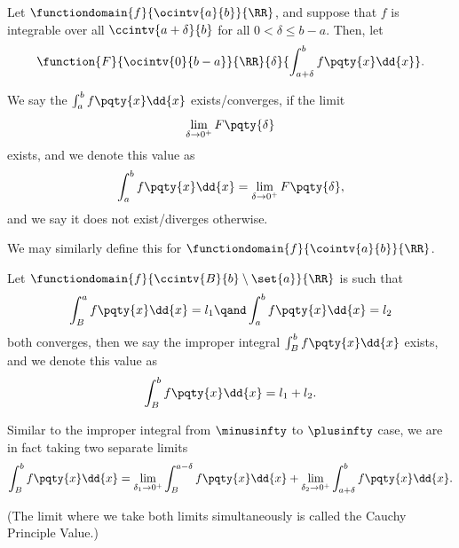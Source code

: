 \begin{definition}
    \label{def:improper-integral-isolated-singularity}%
    Let \(\functiondomain{f}{\ocintv{a}{b}}{\RR}\), and suppose that \(f\) is integrable over all \(\ccintv{a + \delta}{b}\) for all \(0 < \delta \leq b - a\). Then, let
    \[
        \function{F}{\ocintv{0}{b - a}}{\RR}{\delta}{\int_{a + \delta}^{b} f\pqty{x} \dd{x}}.
    \]

    We say the  \(\int_{a}^{b} f\pqty{x} \dd{x}\) exists/converges, if the limit
    \[
        \lim_{\delta \to 0^+} F\pqty{\delta}
    \]
    exists, and we denote this value as
    \[
        \int_{a}^{b} f\pqty{x} \dd{x} = \lim_{\delta \to 0^+} F\pqty{\delta},
    \]
    and we say it does not exist/diverges otherwise.

    We may similarly define this for \(\functiondomain{f}{\cointv{a}{b}}{\RR}\).

    Let \(\functiondomain{f}{\ccintv{B}{b} \setminus \set{a}}{\RR}\) is such that
    \[
        \int_{B}^{a} f\pqty{x} \dd{x} = l_1 \qand \int_{a}^{b} f\pqty{x} \dd{x} = l_2
    \]
    both converges, then we say the improper integral \(\int_{B}^{b} f\pqty{x} \dd{x}\) exists, and we denote this value as
    \[
        \int_{B}^{b} f\pqty{x} \dd{x} = l_1 + l_2.
    \]
\end{definition}

\begin{remark}
    Similar to the improper integral from \(\minusinfty\) to \(\plusinfty\) case, we are in fact taking two separate limits
    \[
        \int_{B}^{b} f\pqty{x} \dd{x} = \lim_{\delta_1 \to 0^+} \int_{B}^{a - \delta} f\pqty{x} \dd{x} + \lim_{\delta_2 \to 0^+} \int_{a + \delta}^{b} f\pqty{x} \dd{x}.
    \]

    (The limit where we take both limits simultaneously is called the Cauchy Principle Value.)
\end{remark}

